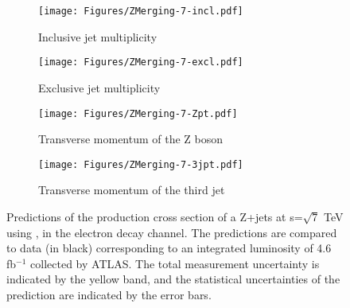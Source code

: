 \begin{figure}[ht] 
  \begin{subfigure}[b]{0.5\linewidth}
    \centering
    \texttt{[image: Figures/ZMerging-7-incl.pdf]} 
    \caption{Inclusive jet multiplicity} 
    \label{fig8:a} 
    \vspace{4ex}
  \end{subfigure}%
  \begin{subfigure}[b]{0.5\linewidth}
    \centering
    \texttt{[image: Figures/ZMerging-7-excl.pdf]}
    \caption{Exclusive jet multiplicity} 
    \label{fig8:b} 
    \vspace{4ex}
  \end{subfigure} 
  \begin{subfigure}[b]{0.5\linewidth}
    \centering
    \texttt{[image: Figures/ZMerging-7-Zpt.pdf]}
    \caption{Transverse momentum of the Z boson} 
    \label{fig8:c} 
  \end{subfigure}%
  \begin{subfigure}[b]{0.5\linewidth}
    \centering
    \texttt{[image: Figures/ZMerging-7-3jpt.pdf]}
    \caption{Transverse momentum of the third jet} 
    \label{fig8:d} 
  \end{subfigure} 
  \caption{Predictions of the production cross section of a Z+jets at s=$\sqrt{7}$ TeV using , in the electron decay channel. The predictions are compared to data (in black) corresponding to an integrated luminosity of 4.6 fb$^{-1}$ collected by ATLAS. The total measurement uncertainty is indicated by the yellow band, and the statistical uncertainties of the prediction are indicated by the error bars.}
  \label{fig8} 
\end{figure}

